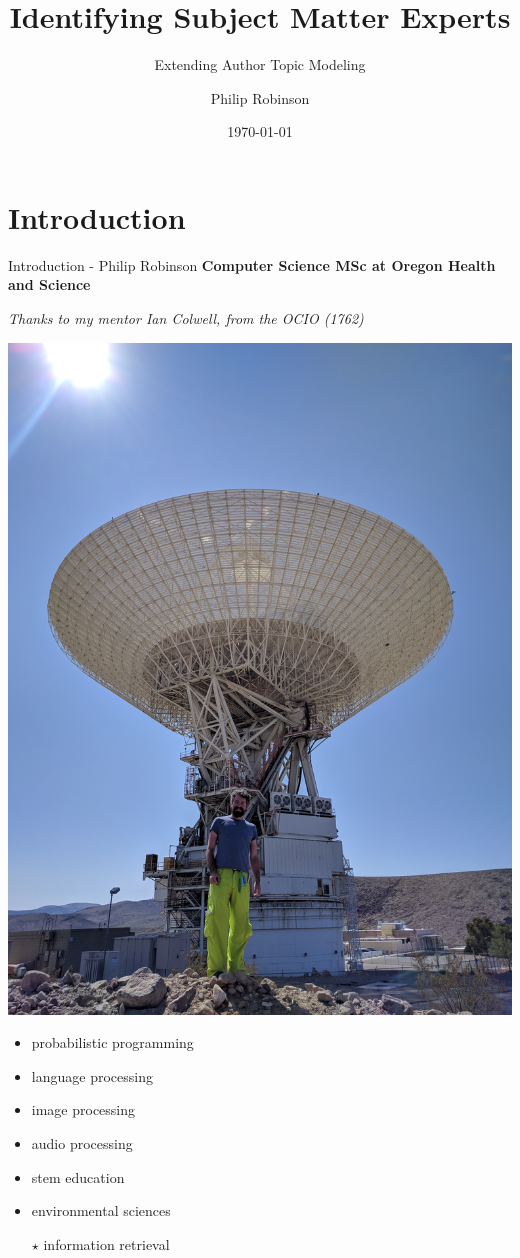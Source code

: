 \documentclass[10pt]{beamer}
\title{Identifying Subject Matter Experts}
\subtitle{Extending Author Topic Modeling}
\author{Philip Robinson}
\date{\today}
\institute{Presented to OCIO \\ NASA - Jet Propulsion Lab}
\begin{document}
\begin{frame}
  \titlepage


\end{frame}

\section{Introduction}
\begin{frame}{Introduction - Philip Robinson}
  {\bf Computer Science MSc at Oregon Health and Science}

  \vspace{1em}

  {\em Thanks to my mentor Ian Colwell, from the OCIO (1762)}

  \begin{multicols}{2}
    \includegraphics[width=\columnwidth]{./philip.jpg}

    \begin{itemize}
    \item probabilistic programming
    \item language processing
    \item image processing
    \item audio processing
    \item stem education
    \item environmental sciences
    \item[$\star$] information retrieval
    \end{itemize}

  \end{multicols}

\end{frame}
\end{document}
